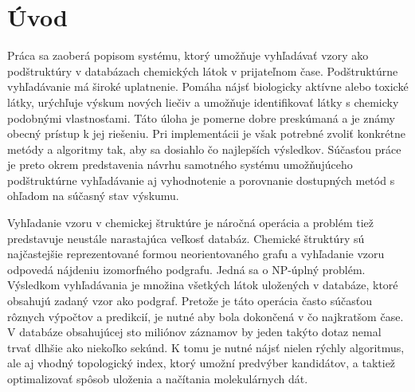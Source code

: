 \documentclass[slovak]{ExcelAtFIT} %
\affiliation{*%
  \href{mailto:xsevci50@stud.fit.vutbr.cz}{xsevci50@stud.fit.vutbr.cz},
  \textit{Faculty of Information Technology, Brno University of Technology}}
\begin{document}
\startdocument



\section{Úvod}
Práca sa zaoberá popisom systému, ktorý umožňuje vyhľadávať vzory ako podštruktúry v databázach chemických látok v prijateľnom čase. Podštruktúrne vy\-hľa\-dá\-va\-nie má široké uplatnenie. Pomáha nájsť biologicky aktívne alebo toxické látky, urýchľuje výskum nových liečiv a umožňuje identifikovať látky s chemicky podobnými vlastnosťami. Táto úloha je pomerne dobre preskúmaná a je známy obecný prístup k jej riešeniu. Pri implementácii je však potrebné zvoliť konkrétne metódy a algoritmy tak, aby sa dosiahlo čo najlepších výsledkov. Súčasťou práce je preto okrem predstavenia návrhu samotného systému umožňujúceho podštruktúrne vy\-hľa\-dá\-va\-nie aj vyhodnotenie a porovnanie dostupných metód s ohľadom na súčasný stav výskumu.

Vyhľadanie vzoru v chemickej štruktúre je náročná operácia a problém tiež predstavuje neustále narastajúca veľkosť databáz. Chemické štruktúry sú naj\-čas\-tej\-šie reprezentované formou neorientovaného grafu a vyhľadanie vzoru odpovedá nájdeniu izomorfného podgrafu. Jedná sa o NP-úplný problém. Výsledkom vyhľadávania je množina všetkých látok uložených v databáze, ktoré obsahujú zadaný vzor ako podgraf. Pretože je táto operácia často súčasťou rôznych vý\-poč\-tov a predikcií, je nutné aby bola dokončená v čo najkratšom čase. V databáze obsahujúcej sto miliónov záznamov by jeden takýto dotaz nemal trvať dlhšie ako niekoľko sekúnd. K tomu je nutné nájsť nielen rýchly algoritmus, ale aj vhodný topologický index, ktorý umožní predvýber kandidátov, a taktiež optimalizovať spôsob uloženia a načítania molekulárnych dát.
\end{document}

